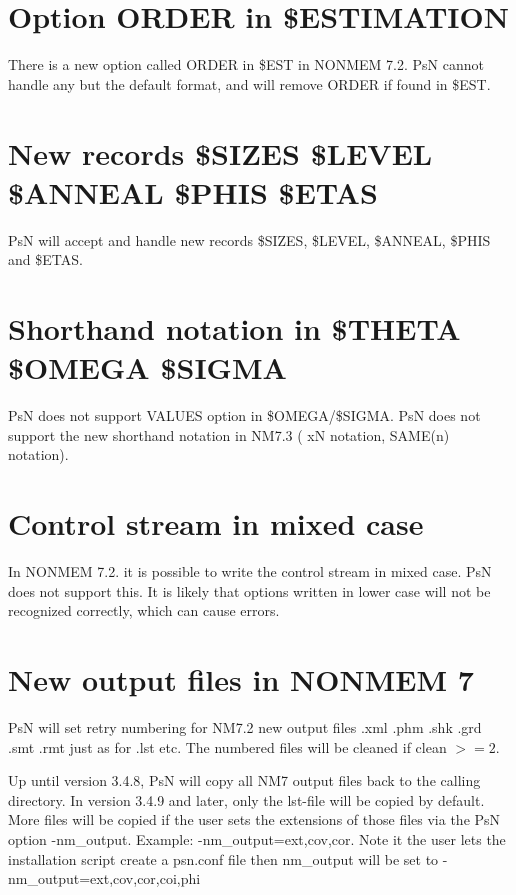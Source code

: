 \documentclass[a4paper,12pt]{article}
\begin{document}
\section{Option ORDER in \$ESTIMATION}

There is a new option called ORDER in \$EST in NONMEM 7.2. PsN cannot handle any but the default format, and will remove ORDER if found in \$EST.

\section{New records \$SIZES \$LEVEL \$ANNEAL \$PHIS \$ETAS}

PsN will accept and handle new records \$SIZES, \$LEVEL, \$ANNEAL, \$PHIS and \$ETAS.

\section{Shorthand notation in \$THETA \$OMEGA \$SIGMA}

PsN does not support VALUES option in \$OMEGA/\$SIGMA. PsN does not support the new shorthand notation in NM7.3 ( xN notation, SAME(n) notation).

\section{Control stream in mixed case}

In NONMEM 7.2. it is possible to write the control stream in mixed case. PsN does not support this. It is likely that options written in lower case will not be recognized correctly, which can cause errors.

\section{New output files in NONMEM 7}

PsN will set retry numbering for NM7.2 new output files .xml .phm .shk .grd .smt .rmt just as for .lst etc. The numbered files will be cleaned if clean $>=2$.

Up until version 3.4.8, PsN will copy all NM7 output files back to the calling directory. In version 3.4.9 and later, only the lst-file will be copied by default. More files will be copied if the user sets the extensions of those files via the PsN option -nm\_output. Example: -nm\_output=ext,cov,cor. Note it the user lets the installation script create a psn.conf file then nm\_output will be set to -nm\_output=ext,cov,cor,coi,phi 
\end{document}
